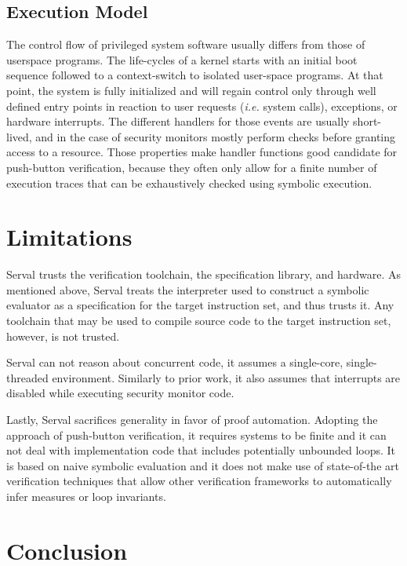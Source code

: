 \documentclass[11pt,a4paper]{article}
\newcommand{\ie}{\textit{i.e.}\xspace}
\begin{document}
\subsection{Execution Model}

The control flow of privileged system software usually differs from those of
userspace programs.
The life-cycles of a kernel starts with an initial boot sequence followed to
a context-switch to isolated user-space programs.
At that point, the system is fully initialized and will regain control only
through well defined entry points in reaction to user requests (\ie system
calls), exceptions, or hardware interrupts.
The different handlers for those events are usually short-lived, and in the case
of security monitors mostly perform checks before granting access to a resource.
Those properties make handler functions good candidate for push-button
verification, because they often only allow for a finite number of execution
traces that can be exhaustively checked using symbolic execution.

\section{Limitations}

Serval trusts the verification toolchain, the specification library, and hardware.
As mentioned above, Serval treats the interpreter used to construct a symbolic
evaluator as a specification for the target instruction set, and thus trusts it.
Any toolchain that may be used to compile source code to the target instruction
set, however, is not trusted.

Serval can not reason about concurrent code, it assumes a single-core,
single-threaded environment. 
Similarly to prior work, it also assumes that interrupts are disabled while
executing security monitor code.

Lastly, Serval sacrifices generality in favor of proof automation. 
Adopting the approach of push-button verification, it requires systems to be
finite and it can not deal with implementation code that includes
potentially unbounded loops. It is based on naive symbolic evaluation and it
does not make use of state-of-the art verification techniques that allow other
verification frameworks to automatically infer measures or loop invariants.

\section{Conclusion}
\end{document}
